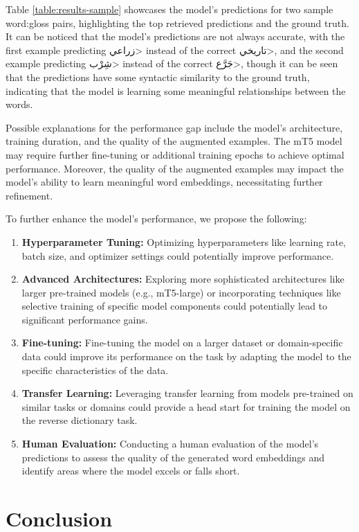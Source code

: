 \documentclass[12.5pt]{article}
\begin{document}
Table \ref{table:results-sample} showcases the model's predictions for two sample word:gloss pairs, highlighting the top retrieved predictions and the ground truth. It can be noticed that the model's predictions are not always accurate, with the first example predicting \<زراعي> instead of the correct \<تاريخي>, and the second example predicting \<شِرْب> instead of the correct \<جَرَّع>, though it can be seen that the predictions have some syntactic similarity to the ground truth, indicating that the model is learning some meaningful relationships between the words.

Possible explanations for the performance gap include the model's architecture, training duration, and the quality of the augmented examples. The mT5 model may require further fine-tuning or additional training epochs to achieve optimal performance. Moreover, the quality of the augmented examples may impact the model's ability to learn meaningful word embeddings, necessitating further refinement.

To further enhance the model's performance, we propose the following:
\begin{enumerate}
    \item \textbf{Hyperparameter Tuning:} Optimizing hyperparameters like learning rate, batch size, and optimizer settings could potentially improve performance.
    \item \textbf{Advanced Architectures:} Exploring more sophisticated architectures like larger pre-trained models (e.g., mT5-large) or incorporating techniques like selective training of specific model components could potentially lead to significant performance gains.
    \item \textbf{Fine-tuning:} Fine-tuning the model on a larger dataset or domain-specific data could improve its performance on the task by adapting the model to the specific characteristics of the data.
    \item \textbf{Transfer Learning:} Leveraging transfer learning from models pre-trained on similar tasks or domains could provide a head start for training the model on the reverse dictionary task.
    \item \textbf{Human Evaluation:} Conducting a human evaluation of the model's predictions to assess the quality of the generated word embeddings and identify areas where the model excels or falls short.
\end{enumerate} 

\newpage

\section{Conclusion}
\end{document}

